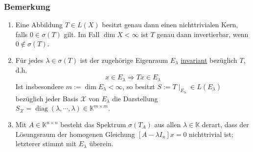 \subsubsection{Bemerkung}
\label{4.2.2}
\renewcommand{\labelenumi}{(\arabic{enumi})}
\begin{enumerate}
\item Eine Abbildung $T\in L(X)$ besitzt genau dann einen nichttrivialen Kern, falls $0\in \sigma (T)$ gilt.  Im Fall $\dim X < \infty$ ist $T$ genau dann invertierbar, wenn $0\not\in\sigma (T)$.
\item Für jedes $\lambda \in \sigma (T)$ ist der zugehörige Eigenraum $E_\lambda$ \underline{invariant} bezüglich $T$, d.h.
\[x\in E_\lambda \Rightarrow Tx\in E_\lambda\]
Ist insbesondere $m:=\dim E_\lambda<\infty$, so besitzt $S:=T\mid _{E_\lambda} \in L(E_\lambda)$ bezüglich jeder Basis $\mathcal{X}$ von $E_\lambda$ die Darstellung $S_\mathcal{X}=\operatorname{diag}(\lambda ,\cdots ,\lambda )\in\mathbb{K}^{m\times m}$.
\item Mit $A\in\mathbb{K}^{n\times n}$ besteht das Spektrum $\sigma (T_A)$ aus allen $\lambda\in\mathbb{K}$ derart, dass der Lösungsraum der homogenen Gleichung $[A-\lambda I_n]x=0$ nichttrivial ist; letzterer stimmt mit $E_\lambda$ überein.
\end{enumerate}
